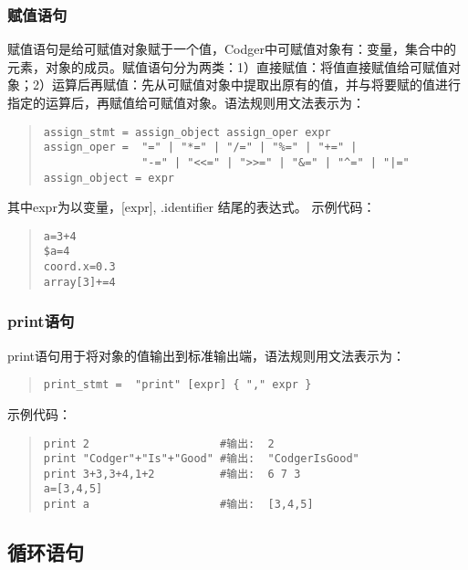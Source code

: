 \subsubsection{赋值语句}
赋值语句是给可赋值对象赋于一个值，Codger中可赋值对象有：变量，集合中的元素，对象的成员。赋值语句分为两类：1）直接赋值：将值直接赋值给可赋值对象；2）运算后再赋值：先从可赋值对象中提取出原有的值，并与将要赋的值进行指定的运算后，再赋值给可赋值对象。语法规则用文法表示为：
\begin{quote}
\begin{verbatim}
assign_stmt = assign_object assign_oper expr 
assign_oper =  "=" | "*=" | "/=" | "%=" | "+=" |
               "-=" | "<<=" | ">>=" | "&=" | "^=" | "|="
assign_object = expr
\end{verbatim}
\end{quote}
其中expr为以变量，[expr], .identifier 结尾的表达式。
示例代码：
\begin{quote}
\begin{verbatim}
a=3+4     
$a=4      
coord.x=0.3
array[3]+=4
\end{verbatim}
\end{quote}
\subsubsection{print语句}
print语句用于将对象的值输出到标准输出端，语法规则用文法表示为：
\begin{quote}
\begin{verbatim}
print_stmt =  "print" [expr] { "," expr }
\end{verbatim}
\end{quote}
示例代码：
\begin{quote}
\begin{verbatim}
print 2                    #输出:  2
print "Codger"+"Is"+"Good" #输出:  "CodgerIsGood"
print 3+3,3+4,1+2          #输出:  6 7 3
a=[3,4,5]
print a                    #输出:  [3,4,5]
\end{verbatim}
\end{quote}



\subsection{循环语句}
